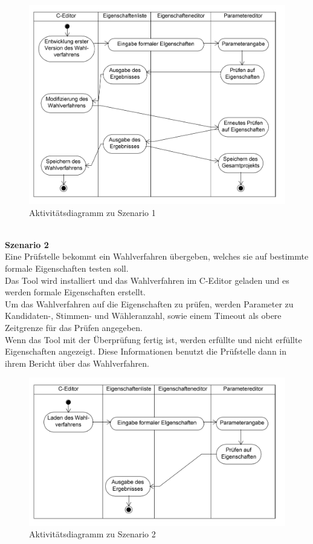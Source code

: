 \documentclass[a4paper]{scrreprt}
\begin{document}
\begin{figure}[H]
\includegraphics[scale=0.12]{ActivityDiagramScenario1.png}
\caption{Aktivitätsdiagramm zu Szenario 1}
\label{Packet-scetch}
\end{figure}
\\
\textbf{Szenario 2}\\
Eine Prüfstelle bekommt ein Wahlverfahren übergeben, welches sie auf bestimmte formale Eigenschaften testen soll.\\
Das Tool wird installiert und das Wahlverfahren im C-Editor geladen und es werden formale Eigenschaften erstellt.\\
Um das Wahlverfahren auf die Eigenschaften zu prüfen, werden Parameter zu \\Kandidaten-, Stimmen- und Wähleranzahl, sowie einem Timeout als obere Zeitgrenze für das Prüfen angegeben.\\
Wenn das Tool mit der Überprüfung fertig ist, werden erfüllte und nicht erfüllte Eigenschaften angezeigt. Diese Informationen benutzt die Prüfstelle dann in ihrem Bericht über das Wahlverfahren.\\

\begin{figure}[H]
\includegraphics[scale=0.12]{ActivityDiagramScenario2.png}
\caption{Aktivitätsdiagramm zu Szenario 2}
\label{Packet-scetch}
\end{figure}
\end{document}

